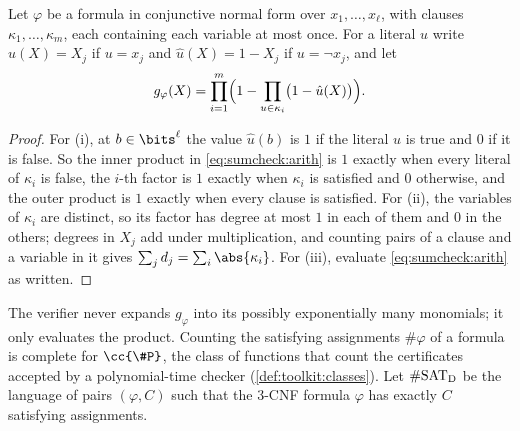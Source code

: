 \begin{refsection}
Let $\varphi$ be a formula in conjunctive normal form over $x_1,\dots,x_\ell$, with clauses $\kappa_1,\dots,\kappa_m$, each containing each variable at most once. For a literal $u$ write $\hat u(X)=X_j$ if $u=x_j$ and $\hat u(X)=1-X_j$ if $u=\neg x_j$, and let
\begin{equation}\label{eq:sumcheck:arith}
g_\varphi(X)=\prod_{i=1}^m\Bigl(1-\prod_{u\in\kappa_i}\bigl(1-\hat u(X)\bigr)\Bigr).
\end{equation}


\begin{proof}
For (i), at $b\in\bits^\ell$ the value $\hat u(b)$ is $1$ if the literal $u$ is true and $0$ if it is false. So the inner product in \eqref{eq:sumcheck:arith} is $1$ exactly when every literal of $\kappa_i$ is false, the $i$-th factor is $1$ exactly when $\kappa_i$ is satisfied and $0$ otherwise, and the outer product is $1$ exactly when every clause is satisfied. For (ii), the variables of $\kappa_i$ are distinct, so its factor has degree at most $1$ in each of them and $0$ in the others; degrees in $X_j$ add under multiplication, and counting pairs of a clause and a variable in it gives $\sum_jd_j=\sum_i\abs{\kappa_i}$. For (iii), evaluate \eqref{eq:sumcheck:arith} as written.
\end{proof}

The verifier never expands $g_\varphi$ into its possibly exponentially many monomials; it only evaluates the product. Counting the satisfying assignments $\#\varphi$ of a formula is complete for $\cc{\#P}$, the class of functions that count the certificates accepted by a polynomial-time checker (\cref{def:toolkit:classes}). Let $\#\mathrm{SAT}_{\mathrm{D}}$ be the language of pairs $(\varphi,C)$ such that the 3-CNF formula $\varphi$ has exactly $C$ satisfying assignments.


\end{refsection}
